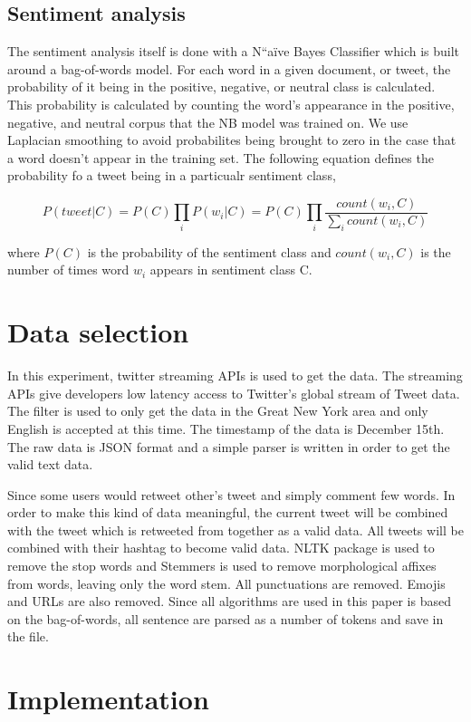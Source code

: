 \documentclass[12pt]{amsart}
\newcommand{\0}{\mat{0}}
\newcommand{\1}{\mathds{1}}
\begin{document}
\subsection{Sentiment analysis}
The sentiment analysis itself is done with a N``a\"ive Bayes Classifier which is built around a bag-of-words model. For each word in a given document, or tweet, the probability of it being in the positive, negative, or neutral class is calculated. This probability is calculated by counting the word's appearance in the positive, negative, and neutral corpus that the NB model was trained on. We use Laplacian smoothing to avoid probabilites being brought to zero in the case that a word doesn't appear in the training set. 
The following equation defines the probability fo a tweet being in a particualr sentiment class,

$$ P(tweet| C) = P(C) \prod_i P(w_i | C) = P(C) \prod_i \frac{count(w_i, C)}{\sum_i count(w_i, C)}$$

where $P(C)$ is the probability of the sentiment class and $count(w_i,C)$ is the number of times word $w_i$ appears in sentiment class C. 

\section{Data selection}

In this experiment, twitter streaming APIs is used to get the data. The streaming APIs give developers low latency access to Twitter's global stream of Tweet data. The filter is used to only get the data in the Great New York area and only English is accepted at this time. The timestamp of the data is December 15th. The raw data is JSON format and a simple parser is written in order to get the valid text data. 

Since some users would retweet other's tweet and simply comment few words. In order to make this kind of data meaningful, the current tweet will be combined with the tweet which is retweeted from together as a valid data. All tweets will be combined with their hashtag to become valid data. NLTK package is used to remove the stop words and Stemmers is used to remove morphological affixes from words, leaving only the word stem. All punctuations are removed. Emojis and URLs are also removed. Since all algorithms are used in this paper is based on the bag-of-words, all sentence are parsed as a number of tokens and save in the file.

\section{Implementation}
\end{document}
